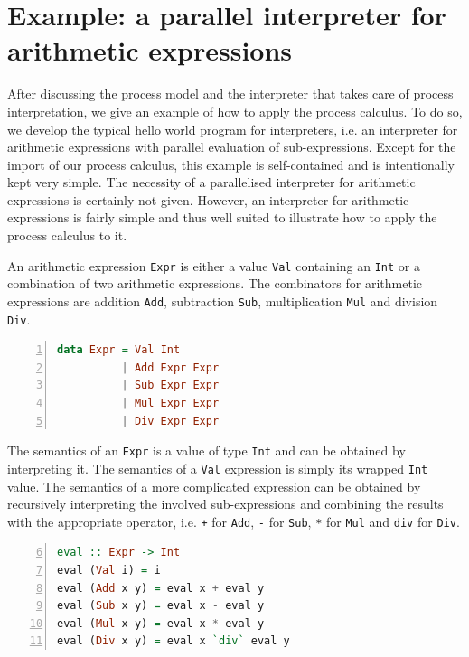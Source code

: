 \clearpage
\section{Example: a parallel interpreter for arithmetic expressions}
\label{chp:example}
After discussing the process model and the interpreter that takes care of process interpretation, we give an example of how to apply the process calculus. To do so, we develop the typical hello world program for interpreters, i.e. an interpreter for arithmetic expressions with parallel evaluation of sub-expressions. Except for the import of our process calculus, this example is self-contained and is intentionally kept very simple. The necessity of a parallelised interpreter for arithmetic expressions is certainly not given. However, an interpreter for arithmetic expressions is fairly simple and thus well suited to illustrate how to apply the process calculus to it.

An arithmetic expression \texttt{Expr} is either a value \texttt{Val} containing an \texttt{Int} or a combination of two arithmetic expressions. The combinators for arithmetic expressions are addition \texttt{Add}, subtraction \texttt{Sub}, multiplication \texttt{Mul} and division \texttt{Div}.
\begin{lstlisting}[language=Haskell, caption=Data model for the representation of arithmetic expressions., label=lst:arith_model, numbers=left, frame=bt]
data Expr = Val Int
          | Add Expr Expr
          | Sub Expr Expr
          | Mul Expr Expr
          | Div Expr Expr
\end{lstlisting}

The semantics of an \texttt{Expr} is a value of type \texttt{Int} and can be obtained by interpreting it. The semantics of a \texttt{Val} expression is simply its wrapped \texttt{Int} value. The semantics of a more complicated expression can be obtained by recursively interpreting the involved sub-expressions and combining the results with the appropriate operator, i.e. \texttt{+} for \texttt{Add}, \texttt{-} \nolinebreak for \texttt{Sub}, \texttt{*} for \texttt{Mul} and \texttt{div} for \texttt{Div}.
\begin{lstlisting}[language=Haskell, caption=Implementation of an interpreter for arithmetic expressions., label=lst:arith_eval, numbers=left, frame=bt, firstnumber=6]
eval :: Expr -> Int
eval (Val i) = i
eval (Add x y) = eval x + eval y
eval (Sub x y) = eval x - eval y
eval (Mul x y) = eval x * eval y
eval (Div x y) = eval x `div` eval y
\end{lstlisting}

